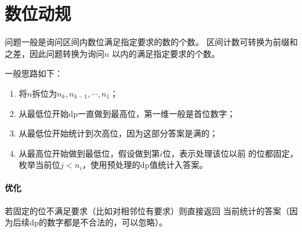 \section{数位动规}
问题一般是询问区间内数位满足指定要求的数的个数。
区间计数可转换为前缀和之差，因此问题转换为询问$n$
以内的满足指定要求的个数。

一般思路如下：
\begin{enumerate}
    \item 将$n$拆位为$n_k,n_{k-1},\cdots,n_1$；
    \item 从最低位开始dp一直做到最高位，第一维一般是首位数字；
    \item 从最低位开始统计到次高位，因为这部分答案是满的；
    \item 从最高位开始做到最低位，假设做到第$i$位，表示处理该位以前
    的位都固定，枚举当前位$j<n_i$，使用预处理的dp值统计入答案。
\end{enumerate}

\paragraph{优化} 若固定的位不满足要求（比如对相邻位有要求）则直接返回
当前统计的答案（因为后续dp的数字都是不合法的，可以忽略）。
